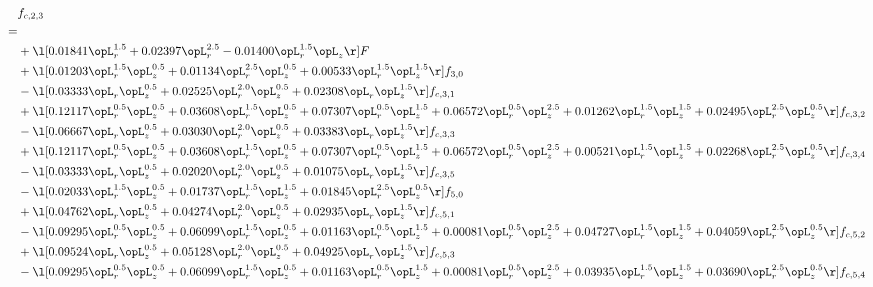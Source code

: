 \begin{alignat}{2} 
\label{eq:f_23_2} 
& f_{c,2,3} \nonumber \\ 
 = \\ 
& + \l[  0.01841 \opL_r^{1.5} +  0.02397 \opL_r^{2.5}   -0.01400 \opL_r^{1.5} \opL_z  \r] F \nonumber \\ 
& + \l[  0.01203 \opL_r^{1.5} \opL_z^{0.5} +  0.01134 \opL_r^{2.5} \opL_z^{0.5} +  0.00533 \opL_r^{1.5} \opL_z^{1.5}  \r] f_{3,0} \nonumber \\ 
& - \l[  0.03333 \opL_r \opL_z^{0.5} +  0.02525 \opL_r^{2.0} \opL_z^{0.5} +  0.02308 \opL_r \opL_z^{1.5}  \r] f_{c,3,1} \nonumber \\ 
& + \l[  0.12117 \opL_r^{0.5} \opL_z^{0.5} +  0.03608 \opL_r^{1.5} \opL_z^{0.5} +  0.07307 \opL_r^{0.5} \opL_z^{1.5} +  0.06572 \opL_r^{0.5} \opL_z^{2.5} +  0.01262 \opL_r^{1.5} \opL_z^{1.5} +  0.02495 \opL_r^{2.5} \opL_z^{0.5}  \r] f_{c,3,2} \nonumber \\ 
& - \l[  0.06667 \opL_r \opL_z^{0.5} +  0.03030 \opL_r^{2.0} \opL_z^{0.5} +  0.03383 \opL_r \opL_z^{1.5}  \r] f_{c,3,3} \nonumber \\ 
& + \l[  0.12117 \opL_r^{0.5} \opL_z^{0.5} +  0.03608 \opL_r^{1.5} \opL_z^{0.5} +  0.07307 \opL_r^{0.5} \opL_z^{1.5} +  0.06572 \opL_r^{0.5} \opL_z^{2.5} +  0.00521 \opL_r^{1.5} \opL_z^{1.5} +  0.02268 \opL_r^{2.5} \opL_z^{0.5}  \r] f_{c,3,4} \nonumber \\ 
& - \l[  0.03333 \opL_r \opL_z^{0.5} +  0.02020 \opL_r^{2.0} \opL_z^{0.5} +  0.01075 \opL_r \opL_z^{1.5}  \r] f_{c,3,5} \nonumber \\ 
& - \l[  0.02033 \opL_r^{1.5} \opL_z^{0.5} +  0.01737 \opL_r^{1.5} \opL_z^{1.5} +  0.01845 \opL_r^{2.5} \opL_z^{0.5}  \r] f_{5,0} \nonumber \\ 
& + \l[  0.04762 \opL_r \opL_z^{0.5} +  0.04274 \opL_r^{2.0} \opL_z^{0.5} +  0.02935 \opL_r \opL_z^{1.5}  \r] f_{c,5,1} \nonumber \\ 
& - \l[  0.09295 \opL_r^{0.5} \opL_z^{0.5} +  0.06099 \opL_r^{1.5} \opL_z^{0.5} +  0.01163 \opL_r^{0.5} \opL_z^{1.5} +  0.00081 \opL_r^{0.5} \opL_z^{2.5} +  0.04727 \opL_r^{1.5} \opL_z^{1.5} +  0.04059 \opL_r^{2.5} \opL_z^{0.5}  \r] f_{c,5,2} \nonumber \\ 
& + \l[  0.09524 \opL_r \opL_z^{0.5} +  0.05128 \opL_r^{2.0} \opL_z^{0.5} +  0.04925 \opL_r \opL_z^{1.5}  \r] f_{c,5,3} \nonumber \\ 
& - \l[  0.09295 \opL_r^{0.5} \opL_z^{0.5} +  0.06099 \opL_r^{1.5} \opL_z^{0.5} +  0.01163 \opL_r^{0.5} \opL_z^{1.5} +  0.00081 \opL_r^{0.5} \opL_z^{2.5} +  0.03935 \opL_r^{1.5} \opL_z^{1.5} +  0.03690 \opL_r^{2.5} \opL_z^{0.5}  \r] f_{c,5,4} \nonumber \\ 

\end{alignat}
